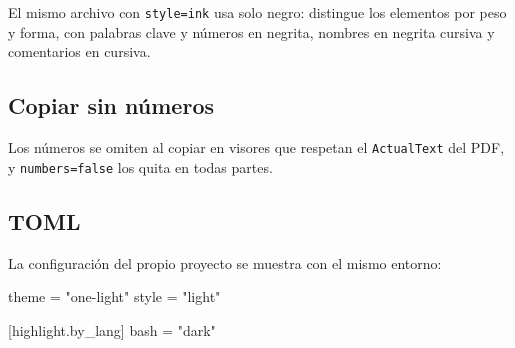 El mismo archivo con \texttt{style=ink} usa solo negro: distingue los
elementos por peso y forma, con palabras clave y números en negrita,
nombres en negrita cursiva y comentarios en cursiva.

\begin{code}[lang=python, file=scripts/stats.py, lines=5-20, numbers=true, style=ink]
\end{code}

\subsection{Copiar sin números}

Los números se omiten al copiar en visores que respetan el
\texttt{ActualText} del PDF, y \texttt{numbers=false} los quita en
todas partes.

\begin{code}[lang=python, file=scripts/stats.py, lines=5-20, numbers=false]
\end{code}

\subsection{TOML}

La configuración del propio proyecto se muestra con el mismo entorno:

\begin{code}[lang=toml]
[highlight]
theme = "one-light"
style = "light"

[highlight.by_lang]
bash = "dark"
\end{code}

\listoflistings
